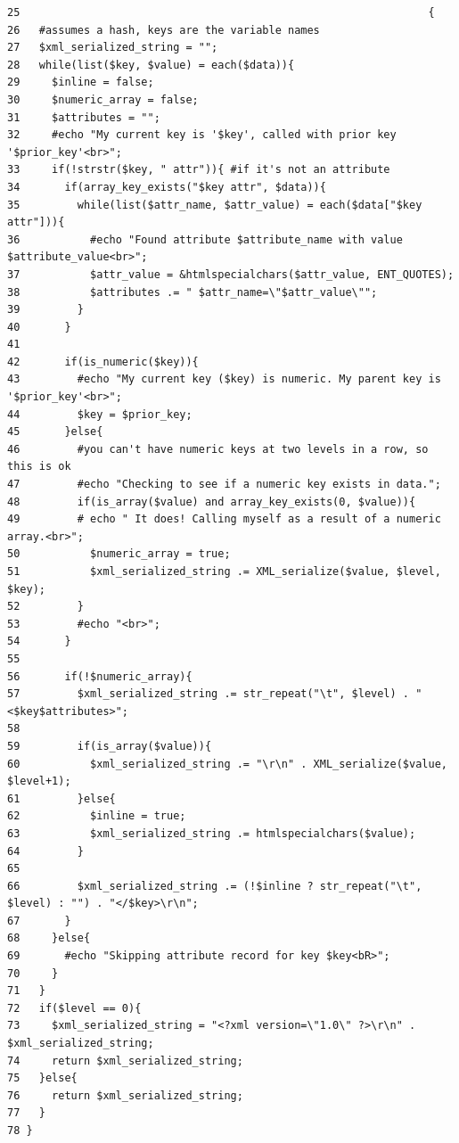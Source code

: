 \begin{Code}\begin{verbatim}25                                                                {
26   #assumes a hash, keys are the variable names
27   $xml_serialized_string = "";
28   while(list($key, $value) = each($data)){
29     $inline = false;
30     $numeric_array = false;
31     $attributes = "";
32     #echo "My current key is '$key', called with prior key '$prior_key'<br>";
33     if(!strstr($key, " attr")){ #if it's not an attribute
34       if(array_key_exists("$key attr", $data)){
35         while(list($attr_name, $attr_value) = each($data["$key attr"])){
36           #echo "Found attribute $attribute_name with value $attribute_value<br>";
37           $attr_value = &htmlspecialchars($attr_value, ENT_QUOTES);
38           $attributes .= " $attr_name=\"$attr_value\"";
39         }
40       }
41 
42       if(is_numeric($key)){
43         #echo "My current key ($key) is numeric. My parent key is '$prior_key'<br>";
44         $key = $prior_key;
45       }else{
46         #you can't have numeric keys at two levels in a row, so this is ok
47         #echo "Checking to see if a numeric key exists in data.";
48         if(is_array($value) and array_key_exists(0, $value)){
49         # echo " It does! Calling myself as a result of a numeric array.<br>";
50           $numeric_array = true;
51           $xml_serialized_string .= XML_serialize($value, $level, $key);
52         }
53         #echo "<br>";
54       }
55 
56       if(!$numeric_array){
57         $xml_serialized_string .= str_repeat("\t", $level) . "<$key$attributes>";
58 
59         if(is_array($value)){
60           $xml_serialized_string .= "\r\n" . XML_serialize($value, $level+1);
61         }else{
62           $inline = true;
63           $xml_serialized_string .= htmlspecialchars($value);
64         }
65 
66         $xml_serialized_string .= (!$inline ? str_repeat("\t", $level) : "") . "</$key>\r\n";
67       }
68     }else{
69       #echo "Skipping attribute record for key $key<bR>";
70     }
71   }
72   if($level == 0){
73     $xml_serialized_string = "<?xml version=\"1.0\" ?>\r\n" . $xml_serialized_string;
74     return $xml_serialized_string;
75   }else{
76     return $xml_serialized_string;
77   }
78 }
\end{verbatim}
\end{Code}




